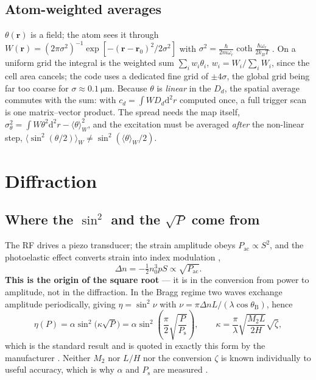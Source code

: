 \documentclass[11pt,a4paper]{article}
\newcommand{\dd}{\mathrm d}
\begin{document}
\subsection{Atom-weighted averages}
$\theta(\mathbf r)$ is a field; the atom sees it through
$W(\mathbf r)=(2\pi\sigma^2)^{-1}\exp[-(\mathbf r-\mathbf r_0)^2/2\sigma^2]$
with $\sigma^2=\frac{\hbar}{2m\omega_r}\coth\frac{\hbar\omega_r}{2k_BT}$
\citep{tuchendler2008}. On a uniform grid the integral is the weighted sum
$\sum_iw_i\theta_i$, $w_i=W_i/\sum_iW_i$, since the cell area cancels; the code
uses a dedicated fine grid of $\pm4\sigma$, the global grid being far too coarse
for $\sigma\approx\SI{0.1}{\micro\meter}$. Because $\theta$ is \emph{linear} in
the $D_d$, the spatial average commutes with the sum: with
$c_d=\int WD_d\dd^2r$ computed once, a full trigger scan is one
matrix--vector product. The spread needs the map itself,
$\sigma_\theta^2=\int W\theta^2\dd^2r-\langle\theta\rangle_W^2$, and the
excitation must be averaged \emph{after} the non-linear step,
$\langle\sin^2(\theta/2)\rangle_W\neq\sin^2(\langle\theta\rangle_W/2)$.

\section{Diffraction}\label{sec:diff}

\subsection{Where the \boldmath$\sin^2$ and the $\sqrt P$ come from}
The RF drives a piezo transducer; the strain amplitude obeys
$P_\mathrm{ac}\propto S^2$, and the photoelastic effect converts strain into
index modulation \citep[Ch.~20]{salehteich2019},
\begin{equation}
\Delta n=-\tfrac12n_0^3pS\propto\sqrt{P_\mathrm{ac}} .
\label{eq:photoelast}
\end{equation}
\textbf{This is the origin of the square root} --- it is in the conversion from
power to amplitude, not in the diffraction. In the Bragg regime two waves
exchange amplitude periodically, giving $\eta=\sin^2\nu$ with
$\nu=\pi\Delta nL/(\lambda\cos\theta_\mathrm B)$, hence
\begin{equation}
\eta(P)=\alpha\sin^2\!\bigl(\kappa\sqrt P\bigr)
=\alpha\sin^2\!\left(\frac\pi2\sqrt{\frac{P}{P_\mathrm{s}}}\right),
\qquad
\kappa=\frac\pi\lambda\sqrt{\frac{M_2L}{2H}}\sqrt\zeta ,
\label{eq:etasingle}
\end{equation}
which is the standard result \citep{korpel1981,salehteich2019} and is quoted in
exactly this form by the manufacturer \citep{aaoptonotes}. Neither $M_2$ nor
$L/H$ nor the conversion $\zeta$ is known individually to useful accuracy,
which is why $\alpha$ and $P_\mathrm{s}$ are measured
\citep{mittenbuehler2024}.
\end{document}
